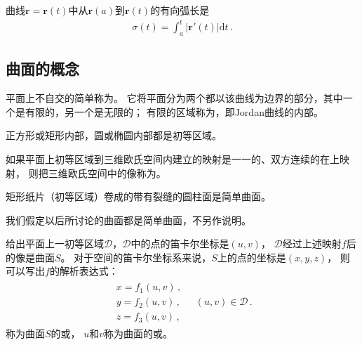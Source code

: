 \begin{corollary}
    曲线$\bm r=\bm r(t)$中从$\bm r(a)$到$\bm r(t)$的有向弧长是
    \begin{align}\label{eq:03ex01.8}
        \sigma(t)=\int_a^t{|\bm r'(t)|\mathrm{d}t}\, .
    \end{align}
\end{corollary}

\subsection{曲面的概念}\label{sub:曲面的概念}
\begin{definition}
    平面上不自交的简单称为。
    它将平面分为两个都以该曲线为边界的部分，其中一个是有限的，另一个是无限的；
    有限的区域称为，即Jordan曲线的内部。
\end{definition}
\begin{example}
    正方形或矩形内部，圆或椭圆内部都是初等区域。
\end{example}

\begin{definition}
    如果平面上初等区域到三维欧氏空间内建立的映射是一一的、双方连续的在上映射，
    则把三维欧氏空间中的像称为。
\end{definition}
\begin{example}
    矩形纸片（初等区域）卷成的带有裂缝的圆柱面是简单曲面。
\end{example}

我们假定以后所讨论的曲面都是简单曲面，不另作说明。

给出平面上一初等区域$\mathscr{D}$，$\mathscr{D}$中的点的笛卡尔坐标是$(u,v)$，
$\mathscr{D}$经过上述映射$f$后的像是曲面$S$。
对于空间的笛卡尔坐标系来说，$S$上的点的坐标是$(x,y,z)$，
则可以写出$f$的解析表达式：
\begin{align}\label{eq:03ex01.9}
    \begin{array}{l}
        x=f_1(u,v)\, , \\
        y=f_2(u,v)\, , \\
        z=f_3(u,v)\, ,
    \end{array}\quad (u,v)\in \mathscr{D}\, .
\end{align}
称为曲面$S$的或，
$u$和$v$称为曲面的或。

